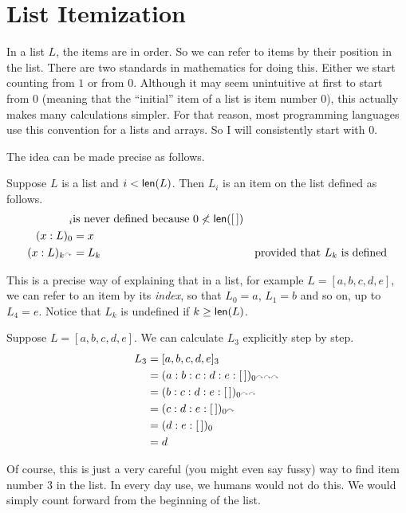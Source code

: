 \section{List Itemization}

In a list $L$, the items are in order. So we can refer to items by
their position in the list. There are two standards in mathematics
for doing this. Either we start counting from $1$ or from $0$.
Although it may seem unintuitive at first to start from $0$ (meaning that
the ``initial'' item of a list is item number $0$), this actually 
makes many calculations simpler. For that reason, most programming
languages use this convention for a lists and arrays. So I will consistently
start with $0$.

The idea can be made precise as follows.

\begin{defn}\label{def:ListIndices}
Suppose $L$ is a list and $i<\mathord{\textsf{len}}(L)$. Then $L_i$ is an item on the list
defined as follows.
\begin{align*}
  [\,]_i &\text{is never defined because $0\not<\len([\,])$}\\
  (x:L)_0 &= x\\
  (x:L)_{k^\nxt} &= L_k &\text{provided that $L_k$ is defined}
\end{align*}
\end{defn}

This is a precise way of explaining that in a list, for example $L=[a,b,c,d,e]$,
we can refer to an item by its \emph{index}, so that $L_0 = a$, $L_1=b$ and so on,
up to $L_4 = e$. Notice that $L_k$ is undefined if $k\geq \mathord{\textsf{len}}(L)$.

\ipadbreak

\begin{example}
Suppose $L=[a,b,c,d,e]$. We can calculate $L_3$ 
explicitly step by step.
\begin{align*}
L_3 &= [a,b,c,d,e]_3\\
    &= (a:b:c:d:e:[\,])_{0^{\curvearrowright\curvearrowright\curvearrowright}}\\
    &= (b:c:d:e:[\,])_{0^{\curvearrowright\curvearrowright}}\\
    &= (c:d:e:[\,])_{0^\curvearrowright}\\
    &= (d:e:[\,])_0\\
    &= d
\end{align*}

Of course, this is just a very careful (you might even say fussy) way to find item number $3$ in the list. 
In every day use, we humans would not do this. 
We would simply count forward
from the beginning of the list.

\end{example}

